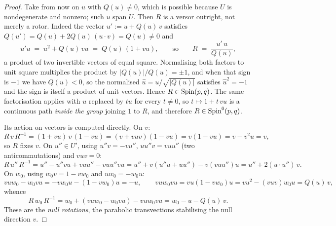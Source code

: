 \begin{proof}
Take from now on $u$ with $Q(u) \neq 0$, which is possible because $U$ is nondegenerate and nonzero; such $u$ span $U$. Then $R$ is a versor outright, not merely a rotor. Indeed the vector $u' \mathrel{:=} u + Q(u)\,v$ satisfies $Q(u') = Q(u) + 2Q(u)\,(u \cdot v) = Q(u) \neq 0$ and
\begin{equation}\label{eq:versorfactor}
u'u \;=\; u^2 + Q(u)\,vu \;=\; Q(u)\,(1 + vu), \qquad \text{so} \qquad R \;=\; \frac{u'\,u}{Q(u)},
\end{equation}
a product of two invertible vectors of equal square. Normalising both factors to unit square multiplies the product by $|Q(u)|/Q(u) = \pm 1$, and when that sign is $-1$ we have $Q(u) < 0$, so the normalised $\hat{u} = u/\sqrt{|Q(u)|}$ satisfies $\hat{u}^2 = -1$ and the sign is itself a product of unit vectors. Hence $R \in \mathrm{Spin}(p,q)$. The same factorisation applies with $u$ replaced by $tu$ for every $t \neq 0$, so $t \mapsto 1 + t\,vu$ is a continuous path \emph{inside the group} joining $1$ to $R$, and therefore $R \in \mathrm{Spin}^0(p,q)$.

Its action on vectors is computed directly. On $v$:
\[
R\,v\,R^{-1} = (1 + vu)\,v\,(1 - vu) = (v + vuv)(1 - vu) = v(1 - vu) = v - v^2u = v ,
\]
so $R$ fixes $v$. On $u'' \in U'$, using $u''v = -vu''$, $u u'' v = v u u''$ (two anticommutations) and $vuv = 0$:
\[
R\,u''\,R^{-1} = u'' - u''vu + vuu'' - vuu''vu = u'' + v(u''u + uu'') - v(vuu'')u = u'' + 2(u \cdot u'')\,v .
\]
On $w_0$, using $w_0 v = 1 - v w_0$ and $u w_0 = -w_0 u$:
\[
vuw_0 - w_0vu = -vw_0u - (1 - vw_0)u = -u, \qquad
vuw_0vu = vu(1 - vw_0)u = vu^2 - (vuv)w_0u = Q(u)\,v,
\]
whence
\[
R\,w_0\,R^{-1} = w_0 + (vuw_0 - w_0vu) - vuw_0vu = w_0 - u - Q(u)\,v .
\]
These are the \emph{null rotations}, the parabolic transvections stabilising the null direction $v$.


\end{proof}

